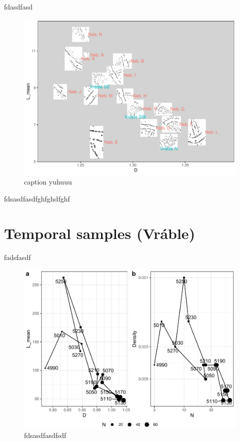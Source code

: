 \documentclass[
  12pt,
]{book}
\begin{document}
fdasdfasd

\begin{figure}
\hypertarget{fig09-quarters}{%
\centering
\includegraphics{Results/fig09_quarters.pdf}
\caption{caption yuhuuu}\label{fig09-quarters}
}
\end{figure}

fdsasdfasdfghfghdfghf

\hypertarget{temporal-samples-vruxe1ble-1}{%
\section{Temporal samples (Vráble)}\label{temporal-samples-vruxe1ble-1}}

fadsfasdf



\begin{figure}

{\centering \includegraphics[width=0.9\linewidth]{bookdown-demo_files/figure-latex/09-time-points-1} 

}

\caption{fdsasdfasdfsdf}\label{fig:09-time-points}
\end{figure}
\end{document}
